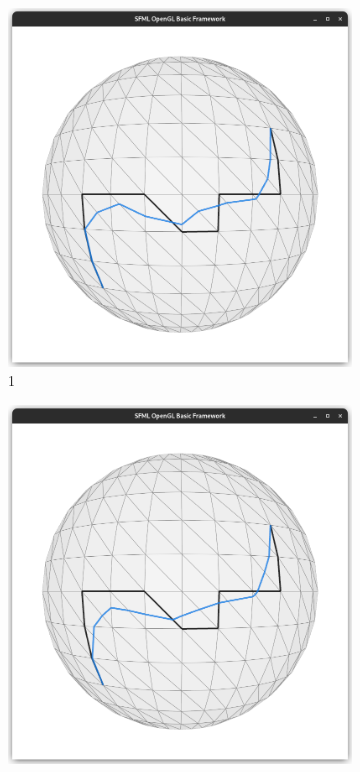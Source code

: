 \documentclass{stdlocal}
\begin{document}
\begin{figure}
  \centering
  \begin{subfigure}[b]{0.24\linewidth}
    \centering
    \includegraphics[width=\linewidth,trim={25px 20 25 50},clip]{images/sphere-geodesic-1-iteration-1.png}
    \caption{1}
  \end{subfigure}
  \begin{subfigure}[b]{0.24\linewidth}
    \centering
    \includegraphics[width=\linewidth,trim={25px 20 25 50},clip]{images/sphere-geodesic-1-iteration-2.png}

\end{subfigure}
\end{figure}
\end{document}
